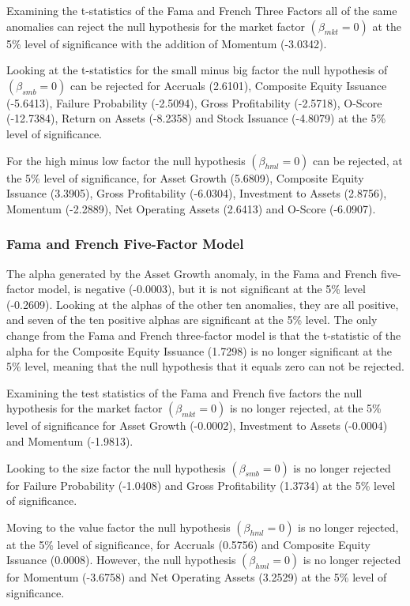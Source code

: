 \documentclass[12pt, a4paper, oneside]{article}
\begin{document}
Examining the t-statistics of the Fama and French Three Factors all of the same anomalies can reject the null hypothesis for the market factor $(\beta_{mkt}= 0)$ at the 5\% level of significance with the addition of Momentum (-3.0342). 

Looking at the t-statistics for the small minus big factor the null hypothesis of $(\beta_{smb}= 0)$ can be rejected for Accruals (2.6101), Composite Equity Issuance (-5.6413), Failure Probability (-2.5094), Gross Profitability (-2.5718), O-Score (-12.7384), Return on Assets (-8.2358) and Stock Issuance (-4.8079) at the 5\% level of significance. 

For the high minus low factor the null hypothesis $(\beta_{hml}= 0)$ can be rejected, at the 5\% level of significance, for Asset Growth (5.6809), Composite Equity Issuance (3.3905), Gross Profitability (-6.0304), Investment to Assets (2.8756), Momentum (-2.2889), Net Operating Assets (2.6413) and O-Score (-6.0907).

\subsubsection{Fama and French Five-Factor Model}
The alpha generated by the Asset Growth anomaly, in the Fama and French five-factor model, is negative (-0.0003), but it is not significant at the 5\% level (-0.2609). Looking at the alphas of the other ten anomalies, they are all positive, and seven of the ten positive alphas are significant at the 5\% level. The only change from the Fama and French three-factor model is that the t-statistic of the alpha for the Composite Equity Issuance (1.7298) is no longer significant at the 5\% level, meaning that the null hypothesis that it equals zero can not be rejected.

Examining the test statistics of the Fama and French five factors the null hypothesis for the market factor $(\beta_{mkt}= 0)$ is no longer rejected, at the 5\% level of significance for Asset Growth (-0.0002), Investment to Assets (-0.0004) and Momentum (-1.9813). 

Looking to the size factor the null hypothesis $(\beta_{smb}= 0)$ is no longer rejected for Failure Probability (-1.0408) and Gross Profitability (1.3734) at the 5\% level of significance.

Moving to the value factor the null hypothesis $(\beta_{hml}= 0)$ is no longer rejected, at the 5\% level of significance, for Accruals (0.5756) and Composite Equity Issuance (0.0008). However, the null hypothesis $(\beta_{hml}= 0)$ is no longer rejected for Momentum (-3.6758) and Net Operating Assets (3.2529) at the 5\% level of significance.
\end{document}
